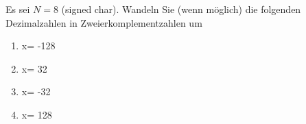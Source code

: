 Es sei $N = 8$ (signed char). Wandeln Sie (wenn möglich) die folgenden Dezimalzahlen in Zweierkomplementzahlen um
\begin{enumerate}
	\item x= -128
	\item x= 32
	\item x= -32
	\item x= 128
\end{enumerate}

